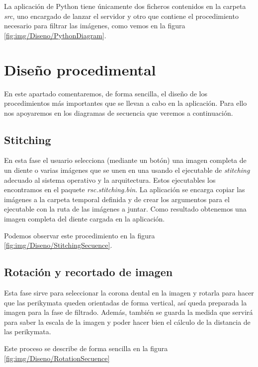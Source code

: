 La aplicación de Python tiene únicamente dos ficheros contenidos en la carpeta \textit{src}, uno encargado de lanzar el servidor y otro que contiene el procedimiento necesario para filtrar las imágenes, como vemos en la figura \ref{fig:img/Diseno/PythonDiagram}.


\section{Diseño procedimental}
En este apartado comentaremos, de forma sencilla, el diseño de los procedimientos más importantes  que se llevan a cabo en la aplicación. Para ello nos apoyaremos en los diagramas de secuencia que veremos a continuación.

\subsection{Stitching}
En esta fase el usuario selecciona (mediante un botón) una imagen completa de un diente o varias imágenes que se unen en una usando el ejecutable de \textit{stitching} adecuado al sistema operativo y la arquitectura. Estos ejecutables los encontramos en el paquete \textit{rsc.stitching.bin}. La aplicación se encarga copiar las imágenes a la carpeta temporal definida y de crear los argumentos para el ejecutable con la ruta de las imágenes a juntar. Como resultado obtenemos una imagen completa del diente cargada en la aplicación.

Podemos observar este procedimiento en la figura \ref{fig:img/Diseno/StitchingSecuence}.

\subsection{Rotación y recortado de imagen}
Esta fase sirve para seleccionar la corona dental en la imagen y rotarla para hacer que las perikymata queden orientadas de forma vertical, así queda preparada la imagen para la fase de filtrado. Además, también se guarda la medida que servirá para saber la escala de la imagen y poder hacer bien el cálculo de la distancia de las perikymata.

Este proceso se describe de forma sencilla en la figura \ref{fig:img/Diseno/RotationSecuence}

